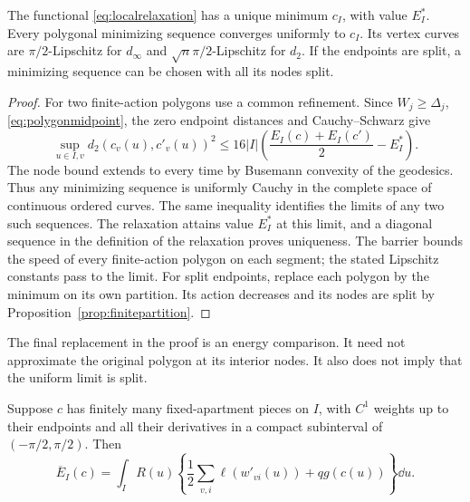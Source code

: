 \begin{proposition}\label{prop:localrelaxedminimum}
The functional \eqref{eq:localrelaxation} has a unique minimum $c_I$,
with value $E_I^*$. Every polygonal minimizing sequence converges
uniformly to $c_I$. Its vertex curves are $\pi/2$-Lipschitz for
$d_\infty$ and $\sqrt n\pi/2$-Lipschitz for $d_2$.
If the endpoints are split, a minimizing sequence can be chosen with
all its nodes split.
\end{proposition}

\begin{proof}
For two finite-action polygons use a common refinement. Since
$W_j\ge\Delta_j$, \eqref{eq:polygonmidpoint}, the zero endpoint
distances and Cauchy--Schwarz give
\begin{equation}\label{eq:localstability}
 \sup_{u\in I,v}d_2(c_v(u),c'_v(u))^2
 \le16|I|\left(\frac{E_I(c)+E_I(c')}{2}-E_I^*\right).
\end{equation}
The node bound extends to every time by Busemann convexity of the
geodesics. Thus any minimizing sequence is uniformly Cauchy in the
complete space of continuous ordered curves. The same inequality
identifies the limits of any two such sequences. The relaxation
attains value $E_I^*$ at this limit, and a diagonal sequence in the
definition of the relaxation proves uniqueness. The barrier bounds
the speed of every finite-action polygon on each segment; the stated
Lipschitz constants pass to the limit. For split endpoints, replace
each polygon by the minimum on its own partition. Its action decreases
and its nodes are split by Proposition~\ref{prop:finitepartition}.
\end{proof}

The final replacement in the proof is an energy comparison. It need
not approximate the original polygon at its interior nodes. It also
does not imply that the uniform limit is split.

\begin{lemma}\label{lem:regularaction}
Suppose $c$ has finitely many fixed-apartment pieces on $I$, with
$C^1$ weights up to their endpoints and all their derivatives in a
compact subinterval of $(-\pi/2,\pi/2)$. Then
\begin{equation}\label{eq:differentialaction}
 \overline E_I(c)=\int_I R(u)
       \left\{\frac12\sum_{v,i}\ell(w'_{vi}(u))+qg(c(u))\right\}\dd u.
\end{equation}
\end{lemma}

